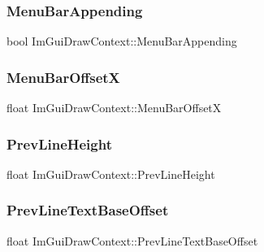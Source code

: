 \subsubsection{\texorpdfstring{Menu\+Bar\+Appending}{MenuBarAppending}}
{\footnotesize\ttfamily bool Im\+Gui\+Draw\+Context\+::\+Menu\+Bar\+Appending}

\hypertarget{struct_im_gui_draw_context_a18a950aff641d2a87a3057e9449fdf36}{}\label{struct_im_gui_draw_context_a18a950aff641d2a87a3057e9449fdf36} 
\subsubsection{\texorpdfstring{Menu\+Bar\+OffsetX}{MenuBarOffsetX}}
{\footnotesize\ttfamily float Im\+Gui\+Draw\+Context\+::\+Menu\+Bar\+OffsetX}

\hypertarget{struct_im_gui_draw_context_ab4f6d19a049cff7a2fa5d1e9f5f132ab}{}\label{struct_im_gui_draw_context_ab4f6d19a049cff7a2fa5d1e9f5f132ab} 
\subsubsection{\texorpdfstring{Prev\+Line\+Height}{PrevLineHeight}}
{\footnotesize\ttfamily float Im\+Gui\+Draw\+Context\+::\+Prev\+Line\+Height}

\hypertarget{struct_im_gui_draw_context_a72d618764e8a78c5bb7879ad2fe5e308}{}\label{struct_im_gui_draw_context_a72d618764e8a78c5bb7879ad2fe5e308} 
\subsubsection{\texorpdfstring{Prev\+Line\+Text\+Base\+Offset}{PrevLineTextBaseOffset}}
{\footnotesize\ttfamily float Im\+Gui\+Draw\+Context\+::\+Prev\+Line\+Text\+Base\+Offset}

\hypertarget{struct_im_gui_draw_context_aedfc8e281f1d72c7c1882c36bebb00d1}{}\label{struct_im_gui_draw_context_aedfc8e281f1d72c7c1882c36bebb00d1} 
